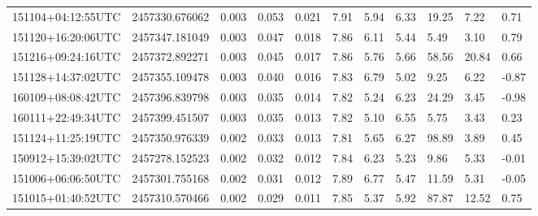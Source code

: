 \begin{table}[ht!]
\begin{tabularx}{1.0\textwidth}{lllllllllll}
151104+04:12:55UTC & 2457330.676062 & 0.003 & 0.053 &      0.021 & 7.91 & 5.94 & 6.33 & 19.25 & 7.22 & 0.71\\
151120+16:20:06UTC & 2457347.181049 & 0.003 & 0.047 &      0.018 & 7.86 & 6.11 & 5.44 & 5.49 & 3.10 & 0.79\\
151216+09:24:16UTC & 2457372.892271 & 0.003 & 0.045 &      0.017 & 7.86 & 5.76 & 5.66 & 58.56 & 20.84 & 0.66\\
151128+14:37:02UTC & 2457355.109478 & 0.003 & 0.040 &      0.016 & 7.83 & 6.79 & 5.02 & 9.25 & 6.22 & -0.87\\
160109+08:08:42UTC & 2457396.839798 & 0.003 & 0.035 &      0.014 & 7.82 & 5.24 & 6.23 & 24.29 & 3.45 & -0.98\\
160111+22:49:34UTC & 2457399.451507 & 0.003 & 0.035 &      0.013 & 7.82 & 5.10 & 6.55 & 5.75 & 3.43 & 0.23\\
151124+11:25:19UTC & 2457350.976339 & 0.002 & 0.033 &      0.013 & 7.81 & 5.65 & 6.27 & 98.89 & 3.89 & 0.45\\
150912+15:39:02UTC & 2457278.152523 & 0.002 & 0.032 &      0.012 & 7.84 & 6.23 & 5.23 & 9.86 & 5.33 & -0.01\\
151006+06:06:50UTC & 2457301.755168 & 0.002 & 0.031 &      0.012 & 7.89 & 6.77 & 5.47 & 11.59 & 5.31 & -0.05\\
151015+01:40:52UTC & 2457310.570466 & 0.002 & 0.029 &      0.011 & 7.85 & 5.37 & 5.92 & 87.87 & 12.52 & 0.75\\

\end{tabularx}
\end{table}
